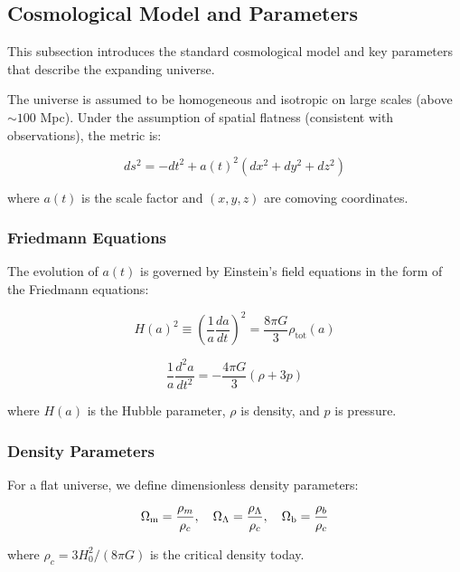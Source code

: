 \subsection{Cosmological Model and Parameters}\label{subsec:background_model}

This subsection introduces the standard cosmological model and key parameters that describe the expanding universe.

The universe is assumed to be homogeneous and isotropic on large scales (above $\sim 100$ Mpc). Under the assumption of spatial flatness (consistent with observations), the metric is:

\begin{equation}
ds^2 = -dt^2 + a(t)^2 (dx^2 + dy^2 + dz^2)
\end{equation}

where $a(t)$ is the scale factor and $(x,y,z)$ are comoving coordinates.

\subsubsection{Friedmann Equations}

The evolution of $a(t)$ is governed by Einstein's field equations in the form of the Friedmann equations:

\begin{equation}
H(a)^2 \equiv \left(\frac{1}{a}\frac{da}{dt}\right)^2 = \frac{8\pi G}{3} \rho_{\mathrm{tot}}(a)
\end{equation}

\begin{equation}
\frac{1}{a}\frac{d^2a}{dt^2} = -\frac{4\pi G}{3}(\rho + 3p)
\end{equation}

where $H(a)$ is the Hubble parameter, $\rho$ is density, and $p$ is pressure.

\subsubsection{Density Parameters}

For a flat universe, we define dimensionless density parameters:

\begin{equation}
\Omega_{\mathrm{m}} = \frac{\rho_m}{\rho_c}, \quad \Omega_{\Lambda} = \frac{\rho_\Lambda}{\rho_c}, \quad \Omega_{\mathrm{b}} = \frac{\rho_b}{\rho_c}
\end{equation}

where $\rho_c = 3H_0^2/(8\pi G)$ is the critical density today.

